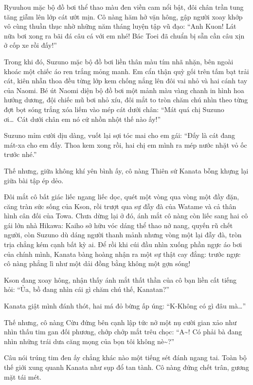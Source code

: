 \documentclass[../main.tex]{subfiles}
\begin{document}
Ryuuhou mặc bộ đồ bơi thể thao màu đen viền cam nổi bật, đôi chân trần tung tăng giẫm lên lớp cát ướt mịn. Cô nàng hăm hở vặn hông, gập người xoay khớp vô cùng thuần thục nhờ những năm tháng luyện tập vũ đạo: ``Anh Kuon! Lát nữa bơi xong ra bãi đá câu cá với em nhé! Bác Toei đã chuẩn bị sẵn cần câu xịn ở cốp xe rồi đấy!''

Trong khi đó, Suzuno mặc bộ đồ bơi liền thân màu tím nhã nhặn, bên ngoài khoác một chiếc áo ren trắng mỏng manh. Em cẩn thận quỳ gối trên tấm bạt trải cát, kiên nhẫn thoa đều từng lớp kem chống nắng lên đôi vai nhỏ và hai cánh tay của Naomi. Bé út Naomi diện bộ đồ bơi một mảnh màu vàng chanh in hình hoa hướng dương, đội chiếc mũ bơi nhỏ xíu, đôi mắt to tròn chăm chú nhìn theo từng đợt bọt sóng trắng xóa liếm vào mép cát dưới chân: ``Mát quá chị Suzuno ơi\dots\ Cát dưới chân em nó cứ nhồn nhột thế nào ấy!''

Suzuno mỉm cười dịu dàng, vuốt lại sợi tóc mai cho em gái: ``Đấy là cát đang mát-xa cho em đấy. Thoa kem xong rồi, hai chị em mình ra mép nước nhặt vỏ ốc trước nhé.''

Thế nhưng, giữa không khí yên bình ấy, cô nàng Thiên sứ Kanata bỗng khựng lại giữa bài tập ép dẻo.

Đôi mắt cô bất giác liếc ngang liếc dọc, quét một vòng qua vòng một đầy đặn, căng tràn sức sống của Kson, rồi trượt qua sự đẫy đà của Watame và cả thân hình cân đối của Towa. Chưa dừng lại ở đó, ánh mắt cô nàng còn liếc sang hai cô gái lớn nhà Hikawa: Kaiho sở hữu vóc dáng thể thao nở nang, quyến rũ chết người, còn Suzuno dù dáng người thanh mảnh nhưng vòng một lại đẫy đà, tròn trịa chẳng kém cạnh bất kỳ ai. Để rồi khi cúi đầu nhìn xuống phần ngực áo bơi của chính mình, Kanata bàng hoàng nhận ra một sự thật cay đắng: trước ngực cô nàng phẳng lì như một dải đồng bằng không một gợn sóng!

Kson đang xoay hông, nhận thấy ánh mắt thất thần của cô bạn liền cất tiếng hỏi: ``Ủa, bồ đang nhìn cái gì chăm chú thế, Kanatan?''

Kanata giật mình đánh thót, hai má đỏ bừng ấp úng: ``K-Không có gì đâu mà\dots''

Thế nhưng, cô nàng Cừu đứng bên cạnh lập tức nở một nụ cười gian xảo như nhìn thấu tim gan đối phương, chớp chớp mắt trêu chọc: ``A\~{}! Có phải bà đang nhìn những trái dưa căng mọng của bọn tôi không nè\~{}?''

Câu nói trúng tim đen ấy chẳng khác nào một tiếng sét đánh ngang tai. Toàn bộ thế giới xung quanh Kanata như sụp đổ tan tành. Cô nàng đứng chết trân, gương mặt tái mét.
\end{document}

